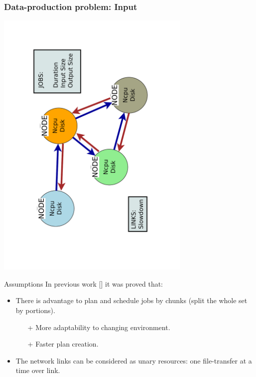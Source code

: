 \documentclass{beamer}
\begin{document}
\begin{frame}\frametitle{Data-production problem: Input}
\vspace{-1cm}
\begin{center}
 	\includegraphics[trim= 30mm 0mm 10mm 0mm,clip,angle =-90, width=0.7\textwidth]{pic/network.pdf}
\end{center}
\vspace{-12mm}
\begin{block}{Assumptions}
In previous work [\cite{Zerola}] it was proved that:
		\begin{itemize}
			\item There is advantage to plan and schedule jobs by chunks (split the whole set by portions). 
					\begin{itemize}
					\item[+]More adaptability to changing environment.
					\item[+]Faster plan creation.
					\end{itemize}				
			\item The network links can be considered as unary resources: one file-transfer at a time over link.
		\end{itemize}
 	\end{block}
\end{frame}
\end{document}
